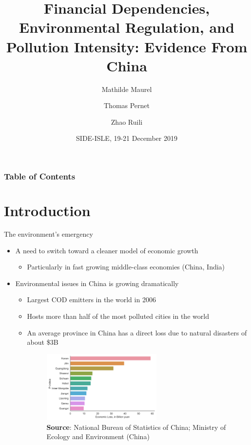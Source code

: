 \documentclass{beamer}
\title[Paper banks and environment] %
{Financial Dependencies, Environmental Regulation, and Pollution Intensity: Evidence From China}
\author[] %
{Mathilde Maurel\inst{1, 2} \and Thomas Pernet\inst{1} \and Zhao Ruili\inst{3}}
\institute[] %
{
  \inst{1}%
  CNRS, France
  \and
  \inst{2}%
  Centre d'Economie de la Sorbonne, Université Paris 1 Panthéon-Sorbonne, France
  \and
  \inst{3}%
  Shanghai University of International Business and Economics, China
}
\date[] %
{SIDE-ISLE, 19-21 December 2019}
\begin{document}
\frame{\titlepage}

\begin{frame}

\frametitle{Table of Contents}
\tableofcontents
\end{frame}

\section{Introduction}

\begin{framefont}{\small}{\footnotesize}{\footnotesize}
    \begin{frame}{The environment's emergency}
        \begin{itemize}
            \item{A need to switch toward a cleaner model of economic growth}
                \begin{itemize}
                    \item{Particularly in fast growing middle-class economies (China, India)}
                \end{itemize}
            \item{Environmental issues in China is growing dramatically}
                \begin{itemize}
                    \item{Largest COD emitters in the world in 2006}
                    \item{Hosts more than half of the most polluted cities in the world}
                    \item{An average province in China has a direct loss due to natural disasters of about \$3B}
                    \begin{figure}[ht]
                        \centering
                        \textbf{}\par\medskip
                        \includegraphics[width=0.6\textwidth]{Econ_loss_presentation.png}\\
                       \scriptsize \textbf{Source}: National Bureau of Statistics of China; Ministry of Ecology and Environment (China)
                    \end{figure}
            \end{itemize}
        \end{itemize}
    \end{frame}
\end{framefont}
\end{document}
